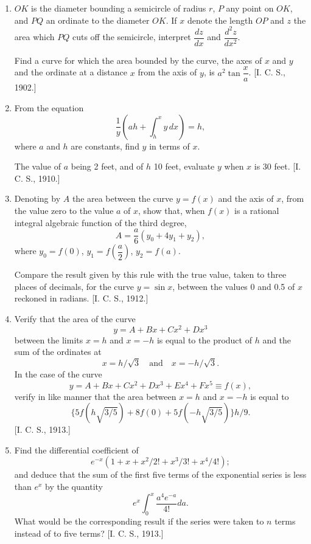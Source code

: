 \documentclass[11pt, a4paper]{article}
\newcommand{\source}[1]{\hfill\textnormal{[#1]}}
\begin{document}
\begin{enumerate}[leftmargin=2em]
Employ this theorem to find an expansion of $\log(1+z)$ in ascending powers of $z$, pointing out the range for which the expansion is valid.

Having given $\log_e 2 = 0.69315$, prove that $\log_e 61 = 4.1109$ to five significant figures. \source{I. C. S., 1904.}

\item $OK$ is the diameter bounding a semicircle of radius $r$, $P$ any point on $OK$, and $PQ$ an ordinate to the diameter $OK$. If $x$ denote the length $OP$ and $z$ the area which $PQ$ cuts off the semicircle, interpret $\dfrac{dz}{dx}$ and $\dfrac{d^2z}{dx^2}$.

Find a curve for which the area bounded by the curve, the axes of $x$ and $y$ and the ordinate at a distance $x$ from the axis of $y$, is $a^2\tan\dfrac{x}{a}$. \source{I. C. S., 1902.}

\item From the equation
\[
\dfrac{1}{y}\left(ah+\int_h^x y\, dx\right)=h,
\]
where $a$ and $h$ are constants, find $y$ in terms of $x$.

The value of $a$ being 2 feet, and of $h$ 10 feet, evaluate $y$ when $x$ is 30 feet. \source{I. C. S., 1910.}

\item Denoting by $A$ the area between the curve $y=f(x)$ and the axis of $x$, from the value zero to the value $a$ of $x$, show that, when $f(x)$ is a rational integral algebraic function of the third degree,
\[
A=\dfrac{a}{6}(y_0+4y_1+y_2),
\]
where $y_0=f(0)$, $y_1=f\left(\dfrac{a}{2}\right)$, $y_2=f(a)$.

Compare the result given by this rule with the true value, taken to three places of decimals, for the curve $y=\sin x$, between the values 0 and 0.5 of $x$ reckoned in radians. \source{I. C. S., 1912.}

\item Verify that the area of the curve
\[
y=A+Bx+Cx^2+Dx^3
\]
between the limits $x=h$ and $x=-h$ is equal to the product of $h$ and the sum of the ordinates at
\[
x=h/\sqrt3 \quad\text{and}\quad x=-h/\sqrt3.
\]
In the case of the curve
\[
y=A+Bx+Cx^2+Dx^3+Ex^4+Fx^5\equiv f(x),
\]
verify in like manner that the area between $x=h$ and $x=-h$ is equal to
\[
\{5f(h\sqrt{3/5})+8f(0)+5f(-h\sqrt{3/5})\}h/9.
\]
\source{I. C. S., 1913.}

\item Find the differential coefficient of
\[
e^{-x}(1+x+x^2/2!+x^3/3!+x^4/4!);
\]
and deduce that the sum of the first five terms of the exponential series is less than $e^x$ by the quantity
\[
e^x\int_0^x \dfrac{a^4e^{-a}}{4!}da.
\]
What would be the corresponding result if the series were taken to $n$ terms instead of to five terms? \source{I. C. S., 1913.}


\end{enumerate}
\end{document}

